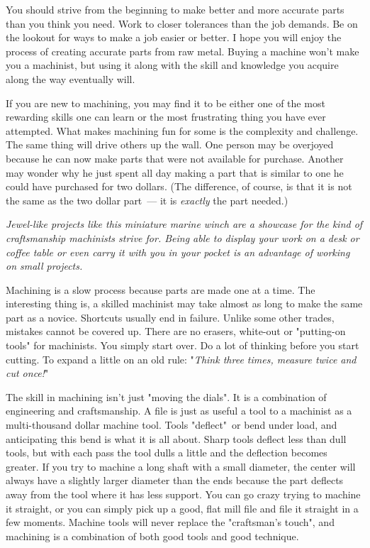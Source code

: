 
You should strive from the beginning to make better and more accurate parts than
you think you need. Work to closer tolerances than the job demands. Be on the
lookout for ways to make a job easier or better. I hope you will enjoy the
process of creating accurate parts from raw metal. Buying a machine won't make
you a machinist, but using it along with the skill and knowledge you acquire
along the way eventually will.


If you are new to machining, you may find it to be either one of the most
rewarding skills one can learn or the most frustrating thing you have ever
attempted. What makes machining fun for some is the complexity and challenge.
The same thing will drive others up the wall. One person may be overjoyed
because he can now make parts that were not available for purchase. Another may
wonder why he just spent all day making a part that is similar to one he could
have purchased for two dollars. (The difference, of course, is that it is not
the same as the two dollar part\ --- it is \emph{exactly} the part needed.)

\bigskip\textit{Jewel-like projects like this miniature marine winch are a
showcase for the kind of craftsmanship machinists strive for. Being able to
display your work on a desk or coffee table or even carry it with you in your
pocket is an advantage of working on small projects.}\bigskip


Machining is a slow process because parts are made one at a time. The
interesting thing is, a skilled machinist may take almost as long to make the
same part as a novice. Shortcuts usually end in failure. Unlike some other
trades, mistakes cannot be covered up. There are no erasers, white-out or
"putting-on tools" for machinists. You simply start over. Do a lot of thinking
before you start cutting. To expand a little on an old rule: "\emph{Think three
times, measure twice and cut once!}"


The skill in machining isn't just "moving the dials". It is a combination of
engineering and craftsmanship. A file is just as useful a tool to a machinist as
a multi-thousand dollar machine tool. Tools "deflect"\ or bend under load, and
anticipating this bend is what it is all about. Sharp tools deflect less than
dull tools, but with each pass the tool dulls a little and the deflection
becomes greater. If you try to machine a long shaft with a small diameter, the
center will always have a slightly larger diameter than the ends because the
part deflects away from the tool where it has less support. You can go crazy
trying to machine it straight, or you can simply pick up a good, flat mill file
and file it straight in a few moments. Machine tools will never replace the
"craftsman's touch", and machining is a combination of both good tools and good
technique.

